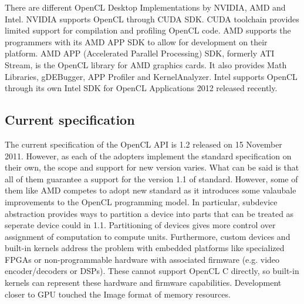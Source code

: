 There are different OpenCL Desktop Implementations by NVIDIA\cite{nvidia2012opencl}, AMD\citep{amd2012devzone} and Intel\cite{intel2012openclsdk}. NVIDIA supports OpenCL through CUDA SDK. CUDA toolchain provides limited support for compilation and profiling OpenCL code. AMD supports the programmers with its AMD APP SDK to allow for development on their platform. AMD APP (Accelerated Parallel Processing) SDK, formerly ATI Stream, is the OpenCL library for AMD graphics cards. It also provides Math Libraries, gDEBugger, APP Profiler and KernelAnalyzer. Intel supports OpenCL through its own Intel SDK for OpenCL Applications 2012 released recently. 

\subsection{Current specification}
The current specification of the OpenCL API is 1.2 released on 15 November 2011. However, as each of the adopters implement the standard specification on their own, the scope and support for new version varies. What can be said is that all of them guarantee a support for the version 1.1 of standard. However, some of them like AMD competes to adopt new standard as it introduces some valaubale improvements to the OpenCL programming model. In particular, subdevice abstraction provides ways to partition a device into parts that can be treated as seperate device could in 1.1. Partitioning of devices gives more control over assignment of computation to compute units. Furthermore, custom devices and built-in kernels address the problem with embedded platforms like specialized FPGAs or non-programmable hardware with associated firmware (e.g. video encoder/decoders or DSPs). These cannot support OpenCL C directly, so built-in kernels can represent these hardware and firmware capabilities. Development closer to GPU touched the Image format of memory resources.\cite{khronos2012cloverview, khronos2012release}

